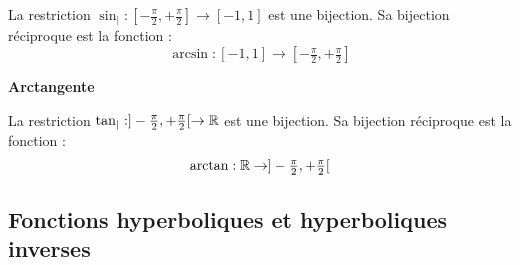 \documentclass[10pt,class=article,crop=false]{standalone}
\begin{document}
\begin{multicols}{2}
La restriction
$\sin_| : [-\tfrac\pi2,+\tfrac\pi2] \to [-1,1]$
est une bijection.
Sa bijection réciproque est la fonction  :
$$\arcsin : [-1,1] \to [-\tfrac\pi2,+\tfrac\pi2]$$







\mybox{$\displaystyle \arcsin'(x) = \frac{1}{\sqrt{1-x^2}} \qquad \forall x \in {}]-1,1[$}


\textbf{Arctangente}

La restriction
$\tan_| : ]-\tfrac\pi2,+\tfrac\pi2[ \to \mathbb{R}$
est une bijection.
Sa bijection réciproque est la fonction  :
$$\arctan : \mathbb{R} \to ]-\tfrac\pi2,+\tfrac\pi2[$$




\mybox{$
	\begin{array}{cl}
		\displaystyle \tan\big(\arctan(x)\big) = x &  \forall x \in \Rr\\
		\displaystyle \arctan\big(\tan(x)\big) = x &  \forall x \in {}]-\frac\pi2,+\frac\pi2[ \\
	\end{array}
	$}

\mybox{$\text{Si } \quad x\in {}]-\frac\pi2,+\frac\pi2[ \qquad \tan(x)=y \iff x = \arctan y$}




\subsection{Fonctions hyperboliques et hyperboliques inverses}


\end{multicols}
\end{document}
